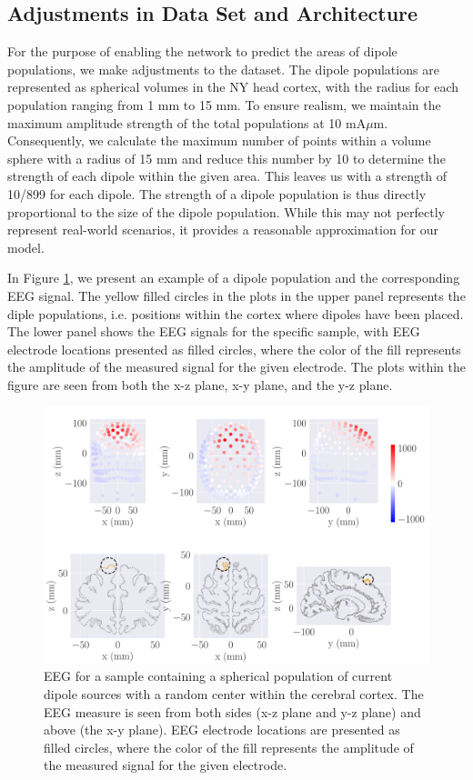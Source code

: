 \documentclass[a4paper, UKenglish, 11pt]{uiomaster}
\begin{document}
\subsection{Adjustments in Data Set and Architecture}

For the purpose of enabling the network to predict the areas of dipole populations, we make adjustments to the dataset. The dipole populations are represented as spherical volumes in the NY head cortex, with the radius for each population ranging from 1 mm to 15 mm. To ensure realism, we maintain the maximum amplitude strength of the total populations at 10 mA$\mu$m. Consequently, we calculate the maximum number of points within a volume sphere with a radius of 15 mm and reduce this number by 10 to determine the strength of each dipole within the given area. This leaves us with a strength of 10/899 for each dipole. The strength of a dipole population is thus directly proportional to the size of the dipole population. While this may not perfectly represent real-world scenarios, it provides a reasonable approximation for our model.

In Figure \ref{fig:dipole_area}, we present an example of a dipole population and the corresponding EEG signal. The yellow filled circles in the plots in the upper panel represents the diple populations, i.e. positions within the cortex where dipoles have been placed. The lower panel shows the EEG signals for the specific sample, with EEG electrode locations presented as filled circles, where the color of the fill represents the amplitude of the measured signal for the given electrode. The plots within the figure are seen from both the x-z plane, x-y plane, and the y-z plane.

\begin{figure}[!htb]
\centering
\includegraphics[width=\linewidth]{figures/dipole_area_reduced_0.pdf}
\caption{EEG for a sample containing a spherical population of current dipole sources with a random center within the cerebral cortex. The EEG measure is seen from both sides (x-z plane and y-z plane) and above (the x-y plane). EEG electrode locations are presented as filled circles, where the color of the fill represents the amplitude of the measured signal for the given electrode.}
\label{fig:dipole_area}
\end{figure}
\end{document}
